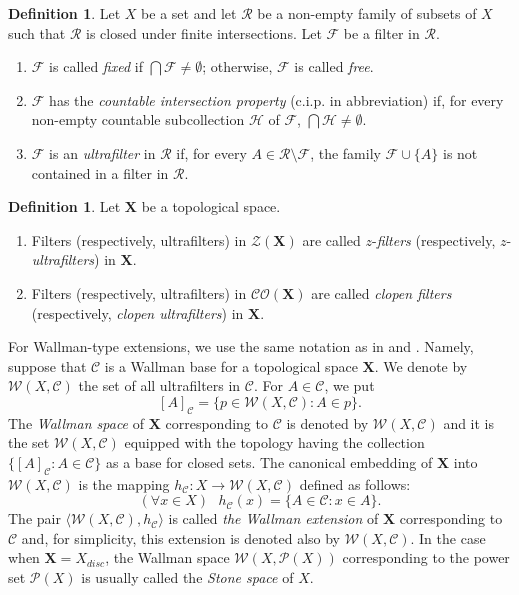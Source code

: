 \documentclass[12pt,twoside,leqno]{article}
\theoremstyle{plain}
\theoremstyle{definition}
\newtheorem{definition}[theorem]{Definition}
\theoremstyle{remark}
\begin{document}
\begin{definition} 
	\label{s1:d27}
	Let $X$ be a set and let $\mathcal{R}$ be a non-empty family of subsets of $X$ such that $\mathcal{R}$ is closed under finite intersections. Let $\mathcal{F}$ be a filter in $\mathcal{R}$.
	\begin{enumerate}
		\item[(i)] $\mathcal{F}$ is called \emph{fixed} if $\bigcap\mathcal{F}\neq\emptyset$; otherwise, $\mathcal{F}$ is called \emph{free}.
		
		\item[(ii)] $\mathcal{F}$ has the \emph{countable intersection property} (c.i.p. in abbreviation) if, for every non-empty countable subcollection $\mathcal{H}$ of $\mathcal{F}$, $\bigcap\mathcal{H}\neq\emptyset$. 
		
		\item[(iii)] $\mathcal{F}$ is an \emph{ultrafilter} in $\mathcal{R}$ if, for every $A\in\mathcal{R}\setminus\mathcal{F}$, the family $\mathcal{F}\cup\{A\}$ is not contained in a filter in $\mathcal{R}$.
	\end{enumerate}
\end{definition}

\begin{definition}
	\label{s1:d28}
	Let $\mathbf{X}$ be a topological space.
	\begin{enumerate}
		\item[(i)]  Filters (respectively, ultrafilters) in $\mathcal{Z}(\mathbf{X})$ are called $z$-\emph{filters} (respectively, $z$-\emph{ultrafil\-ters}) in $\mathbf{X}$. 
		\item[(ii)] Filters (respectively, ultrafilters) in $\mathcal{CO}(\mathbf{X})$ are called \emph{clopen filters} (respectively, \emph{clopen ultrafilters}) in $\mathbf{X}$. 
	\end{enumerate}
\end{definition}

For Wallman-type extensions, we use the same notation as in \cite{pw} and \cite{kw1}. Namely, suppose that $\mathcal{C}$  is a Wallman base for a topological space $\mathbf{X}$. We denote by $\mathcal{W}(X, \mathcal{C})$ the set of all ultrafilters in $\mathcal{C}$. For $A\in\mathcal{C}$, we put
$$[A]_{\mathcal{C}}=\{p\in\mathcal{W}(X, \mathcal{C}): A\in p\}.$$
The  \emph{Wallman space} of $\mathbf{X}$ corresponding to $\mathcal{C}$ is denoted by $\mathcal{W}(X, \mathcal{C})$ and it is the set $\mathcal{W}(X, \mathcal{C})$ equipped with the topology having the collection $\{ [A]_{\mathcal{C}}: A\in\mathcal{C}\}$ as a base for closed sets. The canonical embedding of $\mathbf{X}$ into $\mathcal{W}(X, \mathcal{C})$ is the mapping $h_{\mathcal{C}}: X\to\mathcal{W}(X, \mathcal{C})$ defined as follows:
$$(\forall x\in X) \text{ } h_{\mathcal{C}}(x)=\{A\in \mathcal{C}: x\in A\}.$$ 
The pair $\langle\mathcal{W}(X, \mathcal{C}), h_{\mathcal{C}}\rangle$ is called \emph{the Wallman extension} of $\mathbf{X}$ corresponding to $\mathcal{C}$ and, for simplicity, this extension is denoted also by $\mathcal{W}(X, \mathcal{C})$. In the case when $\mathbf{X}=X_{disc}$, the Wallman space $\mathcal{W}(X, \mathcal{P}(X))$ corresponding to the power set $\mathcal{P}(X)$ is usually called the \emph{Stone space} of $X$.
\end{document}
